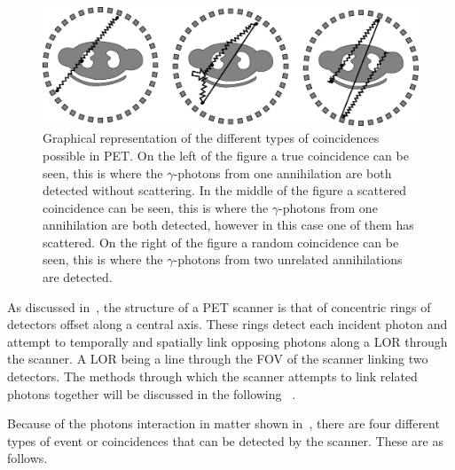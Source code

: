             \begin{figure}
                \centering
                
                \includegraphics[width=1.0\linewidth]{figures/background_coincidence.png}
                
                \captionsetup{singlelinecheck=false}
                \caption{
                    Graphical representation of the different types of coincidences possible in \gls{PET}. On the left of the figure a true coincidence can be seen, this is where the $\gamma$-photons from one annihilation are both detected without scattering. In the middle of the figure a scattered coincidence can be seen, this is where the $\gamma$-photons from one annihilation are both detected, however in this case one of them has scattered. On the right of the figure a random coincidence can be seen, this is where the $\gamma$-photons from two unrelated annihilations are detected.
                }
                \label{fig:data_acquisition_coincidence}
            \end{figure}
            
            As discussed in~, the structure of a \gls{PET} scanner is that of concentric rings of detectors offset along a central axis. These rings detect each incident photon and attempt to temporally and spatially link opposing photons along a \gls{LOR} through the scanner. A \gls{LOR} being a line through the \gls{FOV} of the scanner linking two detectors. The methods through which the scanner attempts to %
            link related photons together will be discussed in the following %
            ~.
            
            Because of the photons interaction in matter shown in~, there are four different types of event or coincidences that can be detected by the scanner. These are as follows.
            
